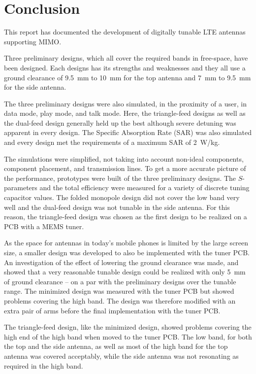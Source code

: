 \section{Conclusion}
\label{cha:conclusion}
This report has documented the development of digitally tunable LTE antennas supporting MIMO. 

Three preliminary designs, which all cover the required bands in free-space, have been designed. Each designs has its strengths and weaknesses and they all use a ground clearance of \SI{9.5}{mm} to \SI{10}{mm} for the top antenna and \SI{7}{mm} to \SI{9.5}{mm} for the side antenna. 

The three preliminary designs were also simulated, in the proximity of a user, in data mode, play mode, and talk mode. Here, the triangle-feed designs as well as the dual-feed design generally held up the best although severe detuning was apparent in every design. The Specific Absorption Rate (SAR) was also simulated and every design met the requirements of a maximum SAR of \SI{2}{W/kg}.

The simulations were simplified, not taking into account non-ideal components, component placement, and transmission lines. To get a more accurate picture of the performance, prototypes were built of the three preliminary designs. The $S$-parameters and the total efficiency were measured for a variety of discrete tuning capacitor values. The folded monopole design did not cover the low band very well and the dual-feed design was not tunable in the side antenna. For this reason, the triangle-feed design was chosen as the first design to be realized on a PCB with a MEMS tuner.

As the space for antennas in today's mobile phones is limited by the large screen size, a smaller design was developed to also be implemented with the tuner PCB. An investigation of the effect of lowering the ground clearance was made, and showed that a very reasonable tunable design could be realized with only \SI{5}{mm} of ground clearance -- on a par with the preliminary designs over the tunable range. The minimized design was measured with the tuner PCB but showed problems covering the high band. The design was therefore modified with an extra pair of arms before the final implementation with the tuner PCB.

The triangle-feed design, like the minimized design, showed problems covering the high end of the high band when moved to the tuner PCB. The low band, for both the top and the side antenna, as well as most of the high band for the top antenna was covered acceptably, while the side antenna was not resonating as required in the high band.


